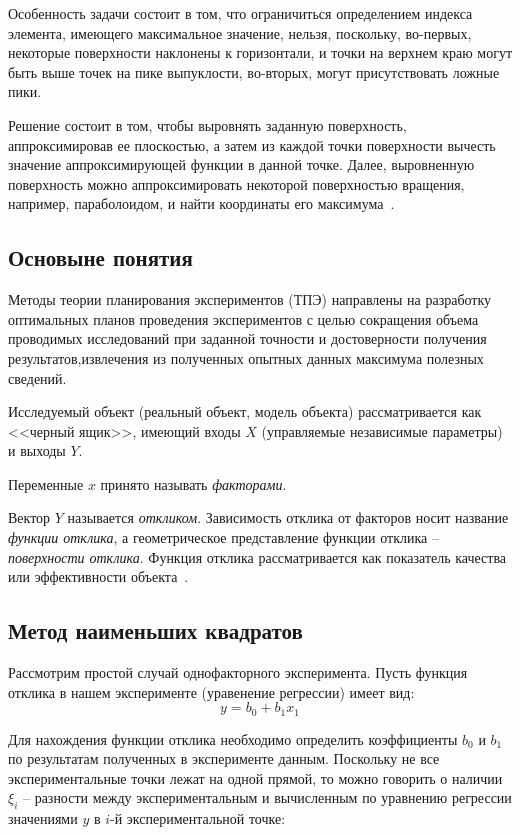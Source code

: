 Особенность задачи состоит в том, что ограничиться определением индекса элемента, имеющего максимальное значение, нельзя, поскольку, во-первых, некоторые поверхности наклонены к горизонтали, и точки на верхнем краю могут быть выше точек на пике выпуклости, во-вторых, могут присутствовать ложные пики.

Решение состоит в том, чтобы выровнять заданную поверхность, аппроксимировав ее плоскостью, а затем из каждой точки поверхности вычесть значение аппроксимирующей функции в данной точке. Далее, выровненную поверхность можно аппроксимировать некоторой поверхностью вращения, например, параболоидом, и найти координаты его максимума~\cite{approximation_plane}.

\subsection{Основыне понятия}

Методы теории планирования экспериментов (ТПЭ) направлены на разработку оптимальных планов проведения экспериментов с целью сокращения объема проводимых исследований при заданной точности и достоверности получения результатов,извлечения из полученных опытных данных максимума полезных сведений.

Исследуемый объект (реальный объект, модель объекта) рассматривается как <<черный ящик>>, имеющий входы $X$ (управляемые независимые параметры) и выходы $Y$.

Переменные $x$ принято называть \emph{факторами}.

Вектор $Y$ называется \emph{откликом}. Зависимость отклика от факторов носит название \emph{функции отклика}, а геометрическое представление функции отклика – \emph{поверхности отклика}. Функция отклика рассматривается как показатель качества или эффективности объекта~\cite{theory_of_plane_experiment}.

\subsection{Метод наименьших квадратов}

Рассмотрим простой случай однофакторного эксперимента. Пусть функция отклика в нашем эксперименте (уравенение регрессии) имеет вид:
\begin{equation}
y = b_0 + b_1 x_1
\end{equation}

Для нахождения функции отклика необходимо определить коэффициенты $b_0$ и $b_1$ по результатам полученных в эксперименте данным. Поскольку не все экспериментальные точки лежат на одной прямой, то можно говорить о наличии $\xi_i$ -- разности между экспериментальным и вычисленным по уравнению регрессии значениями $y$ в $i$-й экспериментальной точке:

